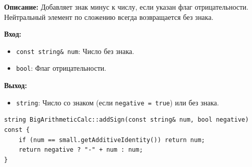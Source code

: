 \textbf{Описание:} Добавляет знак минус к числу, если указан флаг отрицательности.  Нейтральный элемент по сложению всегда возвращается без знака. 

\textbf{Вход:}
\begin{itemize}
    \item \texttt{const string\& num}:  Число без знака.
    \item \texttt{bool}: Флаг отрицательности. 
\end{itemize}

\textbf{Выход:}
\begin{itemize}
    \item \texttt{string}: Число со знаком (если \texttt{negative = true}) или без знака. 
\end{itemize}

\begin{lstlisting}[style=cstyle, caption={Реализация addSign()}]
string BigArithmeticCalc::addSign(const string& num, bool negative) const {
    if (num == small.getAdditiveIdentity()) return num;
    return negative ? "-" + num : num;
}
\end{lstlisting}





    
    

